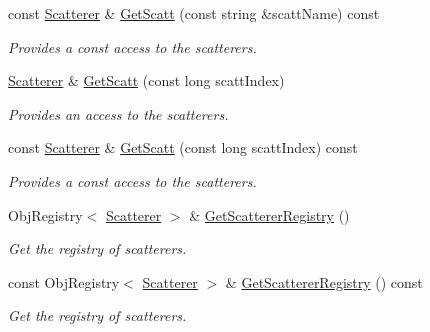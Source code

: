 \begin{DoxyCompactItemize}
const \mbox{\hyperlink{class_obj_cryst_1_1_scatterer}{Scatterer}} \& \mbox{\hyperlink{class_obj_cryst_1_1_crystal_a40a80c90631116e808b613f97092b659}{Get\+Scatt}} (const string \&scatt\+Name) const
\begin{DoxyCompactList}\small\item\em Provides a const access to the scatterers. \end{DoxyCompactList}\item 
\mbox{\hyperlink{class_obj_cryst_1_1_scatterer}{Scatterer}} \& \mbox{\hyperlink{class_obj_cryst_1_1_crystal_adbd7f79dc30dd69a268fa9cc1c2cfed4}{Get\+Scatt}} (const long scatt\+Index)
\begin{DoxyCompactList}\small\item\em Provides an access to the scatterers. \end{DoxyCompactList}\item 
const \mbox{\hyperlink{class_obj_cryst_1_1_scatterer}{Scatterer}} \& \mbox{\hyperlink{class_obj_cryst_1_1_crystal_adab70eb1a70a84ae93b57384cd6b56fc}{Get\+Scatt}} (const long scatt\+Index) const
\begin{DoxyCompactList}\small\item\em Provides a const access to the scatterers. \end{DoxyCompactList}\item 
\mbox{\label{class_obj_cryst_1_1_crystal_a4fcfaa8859bc402d7498849e4bb5de0a}} 
Obj\+Registry$<$ \mbox{\hyperlink{class_obj_cryst_1_1_scatterer}{Scatterer}} $>$ \& \mbox{\hyperlink{class_obj_cryst_1_1_crystal_a4fcfaa8859bc402d7498849e4bb5de0a}{Get\+Scatterer\+Registry}} ()
\begin{DoxyCompactList}\small\item\em Get the registry of scatterers. \end{DoxyCompactList}\item 
\mbox{\label{class_obj_cryst_1_1_crystal_a3f95e4f90992f0d40969cf903041333a}} 
const Obj\+Registry$<$ \mbox{\hyperlink{class_obj_cryst_1_1_scatterer}{Scatterer}} $>$ \& \mbox{\hyperlink{class_obj_cryst_1_1_crystal_a3f95e4f90992f0d40969cf903041333a}{Get\+Scatterer\+Registry}} () const
\begin{DoxyCompactList}\small\item\em Get the registry of scatterers. \end{DoxyCompactList}\item 
\mbox{\label{class_obj_cryst_1_1_crystal_a98b594908ebbdf25249965eaf61eccdc}} 

\end{DoxyCompactItemize}
